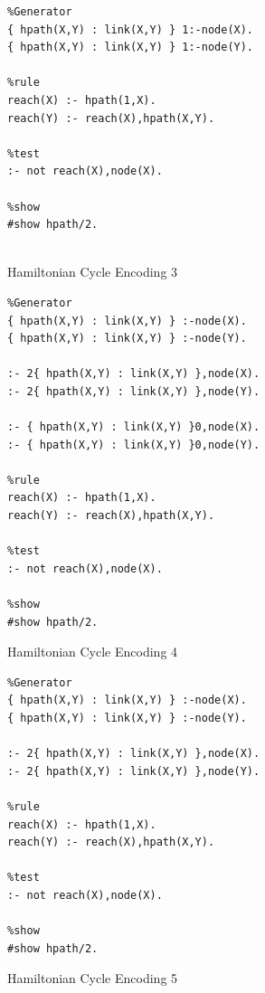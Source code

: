 \documentclass{new_tlp}
\begin{document}
\begin{appendices}
\begin{figure}[h]
\figrule
\begin{center}
\begin{verbatim}
%Generator
{ hpath(X,Y) : link(X,Y) } 1:-node(X).
{ hpath(X,Y) : link(X,Y) } 1:-node(Y).

%rule
reach(X) :- hpath(1,X).
reach(Y) :- reach(X),hpath(X,Y).

%test
:- not reach(X),node(X).

%show
#show hpath/2.


\end{verbatim}
\end{center}
\caption{Hamiltonian Cycle Encoding 3}\label{reachencod}
\figrule
\end{figure}

\begin{figure}[h]
\figrule
\begin{center}
\begin{verbatim}
%Generator
{ hpath(X,Y) : link(X,Y) } :-node(X).
{ hpath(X,Y) : link(X,Y) } :-node(Y).

:- 2{ hpath(X,Y) : link(X,Y) },node(X).
:- 2{ hpath(X,Y) : link(X,Y) },node(Y).

:- { hpath(X,Y) : link(X,Y) }0,node(X).
:- { hpath(X,Y) : link(X,Y) }0,node(Y).

%rule
reach(X) :- hpath(1,X).
reach(Y) :- reach(X),hpath(X,Y).

%test
:- not reach(X),node(X).

%show
#show hpath/2.

\end{verbatim}
\end{center}
\caption{Hamiltonian Cycle Encoding 4}\label{reachencod}
\figrule
\end{figure}

\begin{figure}[h]
\figrule
\begin{center}
\begin{verbatim}
%Generator
{ hpath(X,Y) : link(X,Y) } :-node(X).
{ hpath(X,Y) : link(X,Y) } :-node(Y).

:- 2{ hpath(X,Y) : link(X,Y) },node(X).
:- 2{ hpath(X,Y) : link(X,Y) },node(Y).

%rule
reach(X) :- hpath(1,X).
reach(Y) :- reach(X),hpath(X,Y).

%test
:- not reach(X),node(X).

%show
#show hpath/2.
\end{verbatim}
\end{center}
\caption{Hamiltonian Cycle Encoding 5}\label{reachencod}
\figrule
\end{figure}


\end{appendices}
\end{document}

